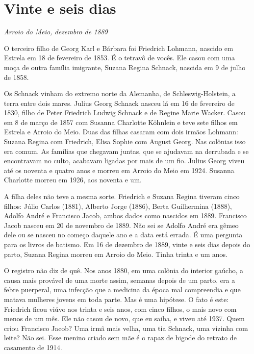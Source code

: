 \documentclass[
  brazilian,
  11pt,
  openany]{book}
\begin{document}
\section{Vinte e seis dias}\label{vinte-e-seis-dias}

\emph{Arroio do Meio, dezembro de 1889}

O terceiro filho de Georg Karl e Bárbara foi Friedrich Lohmann, nascido
em Estrela em 18 de fevereiro de 1853. É o tetravô de vocês. Ele casou
com uma moça de outra família imigrante, Suzana Regina Schnack, nascida
em 9 de julho de 1858.

Os Schnack vinham do extremo norte da Alemanha, de Schleswig-Holstein, a
terra entre dois mares. Julius Georg Schnack nasceu lá em 16 de
fevereiro de 1830, filho de Peter Friedrich Ludwig Schnack e de Regine
Marie Wacker. Casou em 8 de março de 1857 com Susanna Charlotte Köhnlein
e teve sete filhos em Estrela e Arroio do Meio. Duas das filhas casaram
com dois irmãos Lohmann: Suzana Regina com Friedrich, Elisa Sophie com
August Georg. Nas colônias isso era comum. As famílias que chegavam
juntas, que se ajudavam na derrubada e se encontravam no culto, acabavam
ligadas por mais de um fio. Julius Georg viveu até os noventa e quatro
anos e morreu em Arroio do Meio em 1924. Susanna Charlotte morreu em
1926, aos noventa e um.

A filha deles não teve a mesma sorte. Friedrich e Suzana Regina tiveram
cinco filhos: Júlio Carlos (1881), Alberto Jorge (1886), Berta
Guilhermina (1888), Adolfo André e Francisco Jacob, ambos dados como
nascidos em 1889. Francisco Jacob nasceu em 20 de novembro de 1889. Não
sei se Adolfo André era gêmeo dele ou se nasceu no começo daquele ano e
a data está errada. É uma pergunta para os livros de batismo. Em 16 de
dezembro de 1889, vinte e seis dias depois do parto, Suzana Regina
morreu em Arroio do Meio. Tinha trinta e um anos.

O registro não diz de quê. Nos anos 1880, em uma colônia do interior
gaúcho, a causa mais provável de uma morte assim, semanas depois de um
parto, era a febre puerperal, uma infecção que a medicina da época mal
compreendia e que matava mulheres jovens em toda parte. Mas é uma
hipótese. O fato é este: Friedrich ficou viúvo aos trinta e seis anos,
com cinco filhos, o mais novo com menos de um mês. Ele não casou de
novo, que eu saiba, e viveu até 1937. Quem criou Francisco Jacob? Uma
irmã mais velha, uma tia Schnack, uma vizinha com leite? Não sei. Esse
menino criado sem mãe é o rapaz de bigode do retrato de casamento de
1914.
\end{document}
